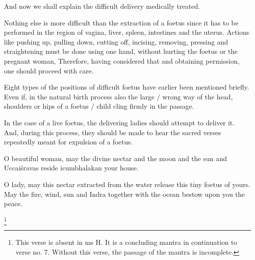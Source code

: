 \begin{translation}
    


    \item [1]  And now we shall explain the difficult delivery medically treated.
    
    \item [3]   Nothing else is more difficult than the extraction of a
foetus since it has to be performed in the region of vagina, liver,
spleen, intestines and the uterus.  Actions like pushing up, pulling
down, cutting off, incising, removing, pressing and straightening
must be done using one hand, without hurting the foetus or the
pregnant woman, Therefore, having considered that and obtaining
permission, one should proceed with care.
    
    \item [4]  Eight types of the positions of difficult
foetus have earlier been mentioned briefly. Even if, in the natural birth process
also the large / wrong way of the head, shoulders or hips of a foetus
/ child cling firmly in the passage.
    
    \item [5]  In the case of a live foetus, the delivering ladies should
attempt to deliver it. And, during this process, they should be made
to hear the sacred verses repeatedly meant for expulsion of a foetus.
  \begin{sloka}
        
    \item [6]  O beautiful woman, may the divine nectar and the moon
and the sun and Uccaiśravas reside icumbhalakan your house.
    
    \item [7]  O lady, may this nectar extracted from the water release
this tiny foetus of yours. May the fire, wind, sun and Indra together
with the ocean bestow upon you the peace.

  \end{sloka}

\item [8] \footnote{This verse is absent in ms H. It is a concluding mantra in continuation to verse no. 7. Without this verse, the passage of the mantra is incomplete.}


\item[9] 


\end{translation}
